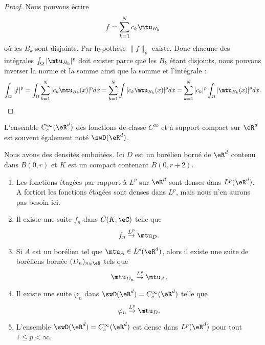 \begin{proof}
	Nous pouvons écrire
	\begin{equation}
		f=\sum_{k=1}^Nc_k\mtu_{B_k}
	\end{equation}
	où les \( B_k\) sont disjoints. Par hypothèse \( \| f \|_p\) existe. Donc chacune des intégrales \( \int_{\Omega}| \mtu_{B_k} |^p\) doit exister parce que les \( B_k\) étant disjoints, nous pouvons inverser la norme et la somme ainsi que la somme et l'intégrale :
	\begin{equation}
		\int_{\Omega}|f|^p=\int_{\Omega}\sum_{k=1}^N| c_k\mtu_{B_k}(x) |^pdx=\sum_{k=1}^N\int| c_k\mtu_{B_k}(x) |^pdx=\sum_{k=1}^N| c_k |^p\int_{\Omega}| \mtu_{B_k}(x) |^pdx.
	\end{equation}
\end{proof}

L'ensemble \(  C^{\infty}_c(\eR^d)\) des fonctions de classe \(  C^{\infty}\) et à support compact sur \( \eR^d\) est souvent également noté \( \swD(\eR^d)\).
\begin{theorem} \label{ThoILGYXhX}
	Nous avons des densités emboitées. Ici \( D\) est un borélien borné de \( \eR^d\) contenu dans \( B(0,r)\) et \( K\) est un compact contenant \( B(0,r+2)\).
	\begin{enumerate}
		\item
		      Les fonctions étagées par rapport à \( L^p\) sur \( \eR^d\) sont denses dans \( L^p(\eR^d)\). A fortiori les fonctions étagées sont denses dans \( L^p\), mais nous n'en aurons pas besoin ici.
		      \item\label{ItemYVFVrOIii}
		      Il existe une suite \( f_n\) dans \(  C(K,\eC)\) telle que
		      \begin{equation}
			      f_n\stackrel{L^p}{\to}\mtu_{D}.
		      \end{equation}
		      \item\label{ItemYVFVrOIiii}
		      Si \( A\) est un borélien tel que \( \mtu_A\in L^p(\eR^d)\), alors il existe une suite de boréliens bornée \( (D_n)_{n\in \eN}\) tels que
		      \begin{equation}
			      \mtu_{D_n}\stackrel{L^p}{\to}\mtu_A.
		      \end{equation}
		      \item\label{ItemYVFVrOIiv}
		      Il existe une suite \( \varphi_n\) dans \( \swD(\eR^d)=  C^{\infty}_c(\eR^d)\) telle que
		      \begin{equation}
			      \varphi_n\stackrel{L^p}{\to}\mtu_{D}.
		      \end{equation}

		      \item\label{ItemYVFVrOIv}
		      L'ensemble \(\swD(\eR^d)= C^{\infty}_c(\eR^d)\) est dense dans \( L^p(\eR^d)\) pour tout \( 1\leq p<\infty\).
	\end{enumerate}
\end{theorem}

